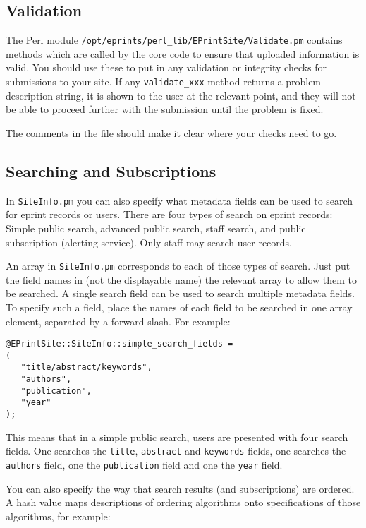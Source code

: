 \subsection{Validation}

The Perl module {\tt /opt/eprints/perl\_lib/EPrintSite/Validate.pm} contains methods which are called by the core code to ensure that uploaded information is valid. You should use these to put in any validation or integrity checks for submissions to your site. If any {\tt validate\_xxx} method returns a problem description string, it is shown to the user at the relevant point, and they will not be able to proceed further with the submission until the problem is fixed.

The comments in the file should make it clear where your checks need to go.


\subsection{Searching and Subscriptions}

In {\tt SiteInfo.pm} you can also specify what metadata fields can be used to search for eprint records or users. There are four types of search on eprint records: Simple public search, advanced public search, staff search, and public subscription (alerting service). Only staff may search user records.

An array in {\tt SiteInfo.pm} corresponds to each of those types of search. Just put the field names in (not the displayable name) the relevant array to allow them to be searched. A single search field can be used to search multiple metadata fields. To specify such a field, place the names of each field to be searched in one array element, separated by a forward slash. For example:

\begin{verbatim}
@EPrintSite::SiteInfo::simple_search_fields =
(
   "title/abstract/keywords",
   "authors",
   "publication",
   "year"
);
\end{verbatim}

This means that in a simple public search, users are presented with four search fields. One searches the {\tt title}, {\tt abstract} and {\tt keywords} fields, one searches the {\tt authors} field, one the {\tt publication} field and one the {\tt year} field.

You can also specify the way that search results (and subscriptions) are ordered. A hash value maps descriptions of ordering algorithms onto specifications of those algorithms, for example:

